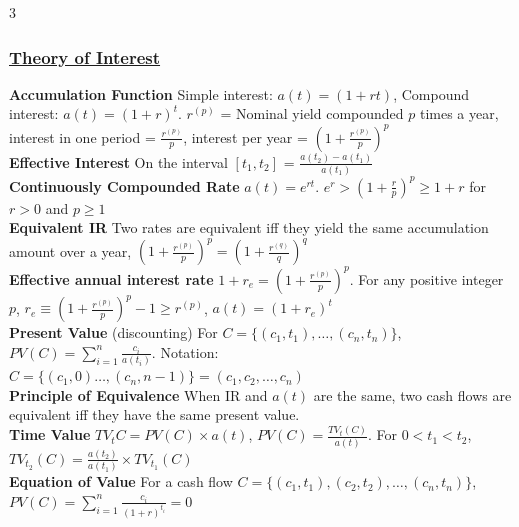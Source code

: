 \documentclass{article}
\begin{document}
\singlespacing

\pagestyle{fancy}
\fancyhf{}
\renewcommand{\headrulewidth}{0pt}


\titlespacing*{\subsubsection}{0pt}{0pt}{0pt}

{\footnotesize
\begin{multicols*}{3}

\subsubsection*{\underline{Theory of Interest}}
\textbf{Accumulation Function} Simple interest: $a(t)=(1+rt)$, Compound interest: $a(t)=(1+r)^t$. $r^{(p)}$ = Nominal yield compounded $p$ times a year, interest in one period = $\frac{r^{(p)}}{p}$, interest per year = $(1+\frac{r^{(p)}}{p})^p$\\
\textbf{Effective Interest} On the interval $[t_1,t_2]$ = $\frac{a(t_2)-a(t_1)}{a(t_1)}$\\
\textbf{Continuously Compounded Rate} $a(t)=e^{rt}$. $e^r>(1+\frac{r}{p})^p\geq 1+r$ for $r>0$ and $p\geq 1$ \\
\textbf{Equivalent IR} Two rates are equivalent iff they yield the same accumulation amount over a year, $(1+\frac{r^{(p)}}{p})^p=(1+\frac{r^{(q)}}{q})^q$\\ 
\textbf{Effective annual interest rate} $1+r_e=(1+\frac{r^{(p)}}{p})^p$. For any positive integer $p$, $r_e\equiv(1+\frac{r^{(p)}}{p})^p-1\geq r^{(p)}$, $a(t)=(1+r_e)^t$\\
\textbf{Present Value} (discounting) For $C=\{(c_1,t_1),\dots,(c_n,t_n)\}$, $PV(C)=\sum_{i=1}^n\frac{c_i}{a(t_i)}$. Notation: $C=\{(c_1,0)\dots,(c_n,n-1)\}=(c_1,c_2,\dots,c_n)$\\
\textbf{Principle of Equivalence} When IR and $a(t)$ are the same, two cash flows are equivalent iff they have the same present value.\\
\textbf{Time Value} $TV_tC=PV(C)\times a(t)$, $PV(C)=\frac{TV_t(C)}{a(t)}$. For $0<t_1<t_2$, $TV_{t_2}(C)=\frac{a(t_2)}{a(t_1)}\times TV_{t_1}(C)$\\
\textbf{Equation of Value} For a cash flow $C=\{(c_1,t_1),(c_2,t_2),\dots,(c_n,t_n)\}$, $PV(C)=\sum_{i=1}^n\frac{c_i}{(1+r)^{t_i}}=0$ \\

\end{multicols*}}
\end{document}
